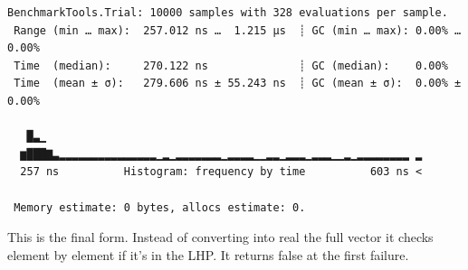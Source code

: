 \documentclass[
  a4paper,
  DIV=11,
  numbers=noendperiod]{scrreprt}
\begin{document}
\begin{verbatim}
BenchmarkTools.Trial: 10000 samples with 328 evaluations per sample.
 Range (min … max):  257.012 ns …  1.215 μs  ┊ GC (min … max): 0.00% … 0.00%
 Time  (median):     270.122 ns              ┊ GC (median):    0.00%
 Time  (mean ± σ):   279.606 ns ± 55.243 ns  ┊ GC (mean ± σ):  0.00% ± 0.00%

   █▃▁                                                          
  ▆███▇▃▂▂▂▂▂▂▂▂▂▂▂▂▂▂▂▁▂▁▂▂▂▂▂▂▂▁▂▂▂▂▁▁▂▂▁▂▂▂▁▂▂▂▁▁▂▁▂▂▂▂▂▂▂▂ ▂
  257 ns          Histogram: frequency by time          603 ns <

 Memory estimate: 0 bytes, allocs estimate: 0.
\end{verbatim}

This is the final form. Instead of converting into real the full vector
it checks element by element if it's in the LHP. It returns false at the
first failure.
\end{document}
